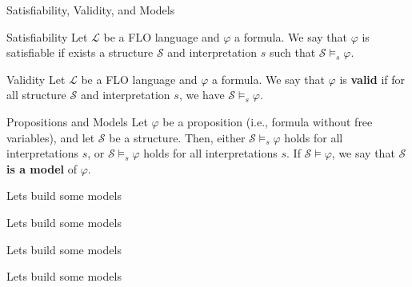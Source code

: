 \documentclass[aspectratio=169]{beamer}
\begin{document}
\begin{slide}{Satisfiability, Validity, and Models}
\begin{block}{Satisfiability}
Let $\mathcal{L}$ be a FLO language and $\varphi$ a formula. We say that $\varphi$ is satisfiable if exists a structure $\mathcal{S}$ and interpretation $s$ such that $\mathcal{S} \models_s \varphi$.
\end{block}

\begin{block}{Validity}
Let $\mathcal{L}$ be a FLO language and $\varphi$ a formula. We say that $\varphi$ is \textbf{valid} if for all structure $\mathcal{S}$ and interpretation $s$, we have $\mathcal{S} \models_s \varphi$.
\end{block}

\begin{block}{Propositions and Models}
Let $\varphi$ be a proposition (i.e., formula without free variables), and let $\mathcal{S}$ be a structure. Then, either $\mathcal{S} \models_s \varphi$ holds for all interpretations $s$, or
$\mathcal{S} \models_s \varphi$ holds for all interpretations $s$. If $\mathcal{S} \models \varphi$, we say that $\mathcal{S}$ \textbf{is a model} of $\varphi$.
\end{block}
\end{slide}

\begin{slide}{Lets build some models}
\end{slide}

\begin{slide}{Lets build some models}
\end{slide}

\begin{slide}{Lets build some models}
\end{slide}

\begin{slide}{Lets build some models}
\end{slide}
\end{document}
